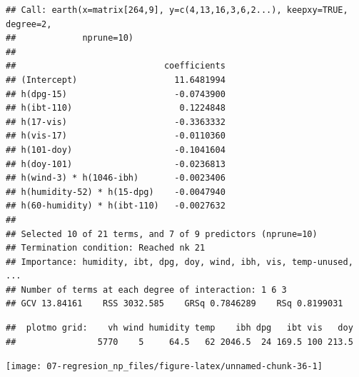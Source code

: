\documentclass[
]{book}
\newenvironment{Shaded}{\begin{snugshade}}{\end{snugshade}}
\newcommand{\CommentTok}[1]{\textcolor[rgb]{0.56,0.35,0.01}{\textit{#1}}}
\newcommand{\DataTypeTok}[1]{\textcolor[rgb]{0.13,0.29,0.53}{#1}}
\newcommand{\DecValTok}[1]{\textcolor[rgb]{0.00,0.00,0.81}{#1}}
\newcommand{\KeywordTok}[1]{\textcolor[rgb]{0.13,0.29,0.53}{\textbf{#1}}}
\newcommand{\NormalTok}[1]{#1}
\newcommand{\OperatorTok}[1]{\textcolor[rgb]{0.81,0.36,0.00}{\textbf{#1}}}
\newcommand{\StringTok}[1]{\textcolor[rgb]{0.31,0.60,0.02}{#1}}
\theoremstyle{break}
\theoremstyle{definition}
\theoremstyle{definition}
\theoremstyle{definition}
\theoremstyle{remark}
\begin{document}
\begin{verbatim}
## Call: earth(x=matrix[264,9], y=c(4,13,16,3,6,2...), keepxy=TRUE, degree=2,
##             nprune=10)
## 
##                             coefficients
## (Intercept)                   11.6481994
## h(dpg-15)                     -0.0743900
## h(ibt-110)                     0.1224848
## h(17-vis)                     -0.3363332
## h(vis-17)                     -0.0110360
## h(101-doy)                    -0.1041604
## h(doy-101)                    -0.0236813
## h(wind-3) * h(1046-ibh)       -0.0023406
## h(humidity-52) * h(15-dpg)    -0.0047940
## h(60-humidity) * h(ibt-110)   -0.0027632
## 
## Selected 10 of 21 terms, and 7 of 9 predictors (nprune=10)
## Termination condition: Reached nk 21
## Importance: humidity, ibt, dpg, doy, wind, ibh, vis, temp-unused, ...
## Number of terms at each degree of interaction: 1 6 3
## GCV 13.84161    RSS 3032.585    GRSq 0.7846289    RSq 0.8199031
\end{verbatim}

\begin{Shaded}
\end{Shaded}

\begin{verbatim}
##  plotmo grid:    vh wind humidity temp    ibh dpg   ibt vis   doy
##                5770    5     64.5   62 2046.5  24 169.5 100 213.5
\end{verbatim}

\begin{center}\texttt{[image: 07-regresion\_np\_files/figure-latex/unnamed-chunk-36-1]} \end{center}

\begin{Shaded}
\end{Shaded}
\end{document}

